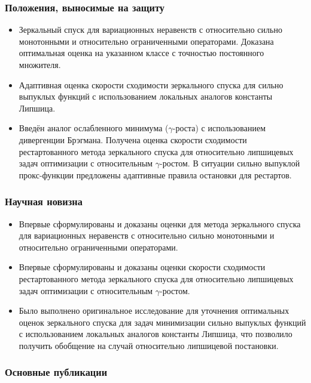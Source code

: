 \begin{frame}
    \frametitle{Положения, выносимые на защиту}
    \begin{itemize}
        \item Зеркальный спуск для вариационных неравенств с относительно сильно монотонными и относительно ограниченными операторами. Доказана оптимальная оценка на указанном классе с точностью  постоянного множителя.
        \item Адаптивная оценка скорости сходимости зеркального спуска для сильно выпуклых функций с использованием локальных аналогов константы Липшица. 
        \item Введён аналог ослабленного минимума ($\gamma$-роста) с использованием дивергенции Брэгмана. Получена оценка скорости сходимости рестартованного метода зеркального спуска для относительно липшицевых задач оптимизации с относительным $\gamma$-ростом. В ситуации сильно выпуклой прокс-функции предложены адаптивные правила остановки для рестартов.
    \end{itemize}
\end{frame}

\begin{frame}
    \frametitle{Научная новизна}
    \begin{itemize}
        \item Впервые сформулированы и доказаны оценки для метода зеркального спуска для вариационных неравенств с относительно сильно монотонными и относительно ограниченными операторами.
        \item Впервые сформулированы и доказаны оценки скорости сходимости рестартованного метода зеркального спуска для относительно липшицевых задач оптимизации с относительным $\gamma$-ростом.
        \item Было выполнено оригинальное исследование для уточнения оптимальных оценок зеркального спуска для задач минимизации сильно выпуклых функций с использованием локальных аналогов константы Липшица, что позволило получить обобщение на случай относительно липшицевой постановки.
    \end{itemize}
\end{frame}

\begin{frame} %
    \frametitle{Основные публикации}
    \nocite{yakovlev2019algorithms}
    \nocite{Stonyakin_2021}
    \nocite{sharp22}
\end{frame}

